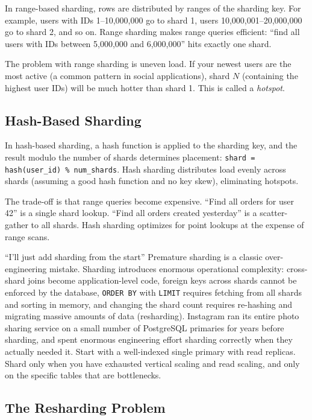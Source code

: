 \documentclass[11pt,a4paper]{article}
\begin{document}
In range-based sharding, rows are distributed by ranges of the sharding key. For example, users with IDs 1--10,000,000 go to shard 1, users 10,000,001--20,000,000 go to shard 2, and so on. Range sharding makes range queries efficient: ``find all users with IDs between 5,000,000 and 6,000,000'' hits exactly one shard.

The problem with range sharding is uneven load. If your newest users are the most active (a common pattern in social applications), shard $N$ (containing the highest user IDs) will be much hotter than shard 1. This is called a \emph{hotspot}.

\subsection{Hash-Based Sharding}

In hash-based sharding, a hash function is applied to the sharding key, and the result modulo the number of shards determines placement: \texttt{shard = hash(user\_id) \% num\_shards}. Hash sharding distributes load evenly across shards (assuming a good hash function and no key skew), eliminating hotspots.

The trade-off is that range queries become expensive. ``Find all orders for user 42'' is a single shard lookup. ``Find all orders created yesterday'' is a scatter-gather to all shards. Hash sharding optimizes for point lookups at the expense of range scans.

\begin{trapbox}{``I'll just add sharding from the start''}
Premature sharding is a classic over-engineering mistake. Sharding introduces enormous operational complexity: cross-shard joins become application-level code, foreign keys across shards cannot be enforced by the database, \texttt{ORDER BY} with \texttt{LIMIT} requires fetching from all shards and sorting in memory, and changing the shard count requires re-hashing and migrating massive amounts of data (resharding). Instagram ran its entire photo sharing service on a small number of PostgreSQL primaries for years before sharding, and spent enormous engineering effort sharding correctly when they actually needed it. Start with a well-indexed single primary with read replicas. Shard only when you have exhausted vertical scaling and read scaling, and only on the specific tables that are bottlenecks.
\end{trapbox}

\subsection{The Resharding Problem}
\end{document}
